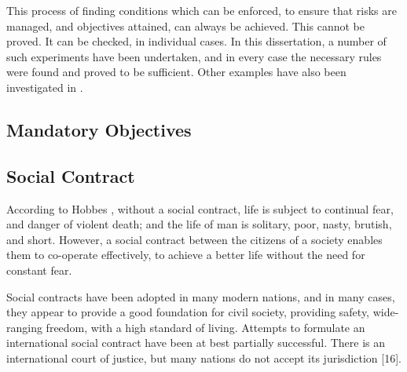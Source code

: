 This process of finding conditions which can be enforced, to ensure
that risks are managed, and objectives attained, can always be
achieved. This cannot be proved. It can be checked, in individual
cases. In this dissertation,  a number of such experiments have been
undertaken, and in every case the necessary rules were found and
proved to be sufficient. Other examples have also been investigated in
\cite{Hadaad15,sheniar2018experiments,sheniar2019Graph}.



\subsection{Mandatory Objectives}
\subsection{Social Contract}
According to Hobbes \cite{Leviathan}, without a social contract, life is subject to continual fear, and danger of violent death; and the life of man is solitary, poor, nasty, brutish, and short. 
However, a social contract between the citizens of a society enables them to co-operate effectively, to achieve a better life without the need for constant fear.

Social contracts have been adopted in many modern nations, and in many cases, they appear to provide a good foundation for civil society, providing safety, wide-ranging freedom, with a high standard of living. Attempts to formulate an international social contract have been at best partially successful. There is an international court of justice, but many nations do not accept its jurisdiction [16].

